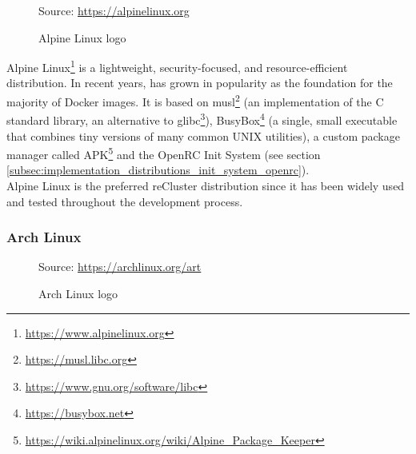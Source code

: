 \begin{figure} %
  \centering
  \def\stackalignment{r} %
  {\scriptsize \parbox[t]{\linewidth}{ Source: \url{https://alpinelinux.org}} }
  \caption{Alpine Linux logo}
\end{figure}

Alpine Linux\footnote{\url{https://www.alpinelinux.org}} is a lightweight, security-focused,
and resource-efficient distribution. In recent years, has grown in popularity as
the foundation for the majority of Docker images. It is based on musl\footnote{\url{https://musl.libc.org}}
(an implementation of the C standard library, an alternative to glibc\footnote{\url{https://www.gnu.org/software/libc}}),
BusyBox\footnote{\url{https://busybox.net}} (a single, small executable that combines
tiny versions of many common UNIX utilities), a custom package manager called APK\footnote{\url{https://wiki.alpinelinux.org/wiki/Alpine_Package_Keeper}}
and the OpenRC Init System (see section
\ref{subsec:implementation_distributions_init_system_openrc})\cite{alpine_linux}.
\\ %
Alpine Linux is the preferred reCluster distribution since it has been widely
used and tested throughout the development process.

\subsubsection{Arch Linux}
\label{subsubsec:implementation_distributions_iso_arch_linux}

\begin{figure} %
  \centering
  \def\stackalignment{r} %
  {\scriptsize \parbox[t]{\linewidth}{ Source: \url{https://archlinux.org/art}} }
  \caption{Arch Linux logo}
\end{figure}

